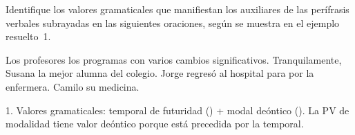 \begin{ejercicio}\label{ej:11-valores}
Identifique los valores gramaticales que manifiestan los auxiliares de las
perífrasis verbales subrayadas en las siguientes oraciones, según se muestra en
el ejemplo resuelto~1.

\begin{exe}
  \ex Los profesores  los programas con
      varios cambios significativos.
  \ex Tranquilamente, Susana  la mejor
      alumna del colegio.
  \ex Jorge regresó al hospital para  por
      la enfermera.
  \ex Camilo  su medicina.
\end{exe}

\begin{resuelto}
1. Valores gramaticales: temporal de futuridad () + modal deóntico
(). La PV de modalidad tiene valor deóntico porque
está precedida por la temporal.
\end{resuelto}
\end{ejercicio}

